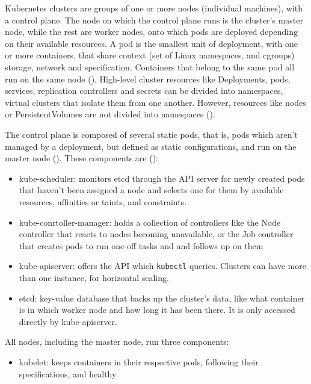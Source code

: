 \documentclass[11pt]{article}
\begin{document}
\begin{flushleft}
    Kubernetes clusters are groups of one or more nodes (individual machines), with a control plane. The node on which the control plane runs is the cluster's master node, while the rest are worker nodes, onto which pods are deployed depending on their available resources. A pod is the smallest unit of deployment, with one or more containers, that share context (set of Linux namespaces, and cgroups) storage, network and specification. Containers that belong to the same pod all run on the same node (\cite{k8spod}). High-level cluster resources like Deployments, pods, services, replication controllers and secrets can be divided into namespaces, virtual clusters that isolate them from one another. However, resources like nodes or PersistentVolumes are not divided into namespaces (\cite{k8sns}).
    \linebreak

    The control plane is composed of several static pods, that is, pods which aren't managed by a deployment, but defined as static configurations, and run on the master node (\cite{k8sstaticpod}). These components are (\cite{k8scomponents}): 

        \begin{itemize}
            \itemsep0em 
            \item kube-scheduler: monitors etcd through the API server for newly created pods that haven't been assigned a node and selects one for them by available resources, affinities or taints, and constraints.

            \item kube-conrtoller-manager: holds a collection of controllers like the Node controller that reacts to nodes becoming unavailable, or the Job controller that creates pods to run one-off tasks and and follows up on them
            \linebreak
            
            \item kube-apiserver: offers the API which \texttt{kubectl} queries. Clusters can have more than one instance, for horizontal scaling.

            \item etcd: key-value database that backs up the cluster's data, like what container is in which worker node and how long it has been there. It is only accessed directly by kube-apiserver.            
        \end{itemize}

    All nodes, including the master node, run three components: 
        \begin{itemize}
            \itemsep0em 
            \item kubelet: keeps containers in their respective pods, following their specifications, and healthy


\end{itemize}
\end{flushleft}
\end{document}
